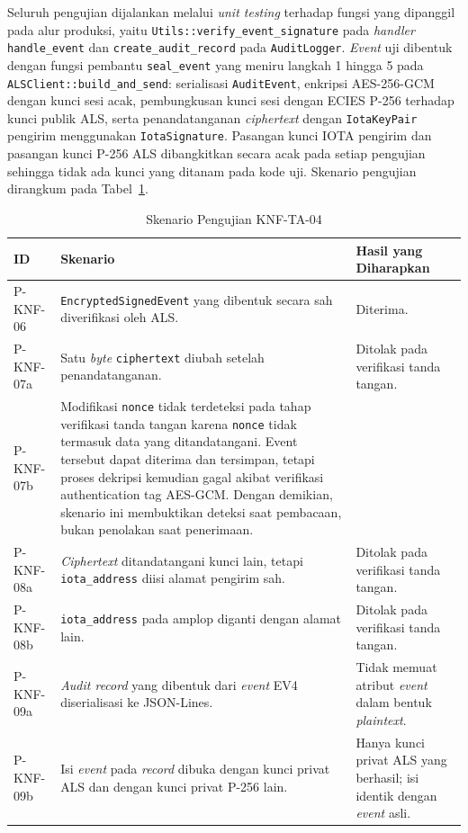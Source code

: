 Seluruh pengujian dijalankan melalui \textit{unit testing} terhadap fungsi yang
dipanggil pada alur produksi, yaitu \texttt{Utils::verify\_event\_signature}
pada \textit{handler} \texttt{handle\_event} dan \texttt{create\_audit\_record}
pada \texttt{AuditLogger}. \textit{Event} uji dibentuk dengan fungsi pembantu
\texttt{seal\_event} yang meniru langkah 1 hingga 5 pada
\texttt{ALSClient::build\_and\_send}: serialisasi \texttt{AuditEvent}, enkripsi
AES-256-GCM dengan kunci sesi acak, pembungkusan kunci sesi dengan ECIES P-256
terhadap kunci publik ALS, serta penandatanganan \textit{ciphertext} dengan
\texttt{IotaKeyPair} pengirim menggunakan \texttt{IotaSignature}. Pasangan kunci
IOTA pengirim dan pasangan kunci P-256 ALS dibangkitkan secara acak pada setiap
pengujian sehingga tidak ada kunci yang ditanam pada kode uji. Skenario
pengujian dirangkum pada Tabel~\ref{tab:skenario-knf-ta-04}.
 
\begin{table}[htbp]
\centering
\caption{Skenario Pengujian KNF-TA-04}
\label{tab:skenario-knf-ta-04}
\renewcommand{\arraystretch}{1.3}
\begin{tabular}{|p{1.7cm}|p{6.3cm}|p{4.5cm}|}
\hline
\textbf{ID} & \textbf{Skenario} & \textbf{Hasil yang Diharapkan} \\
\hline
P-KNF-06 & \texttt{EncryptedSignedEvent} yang dibentuk secara sah diverifikasi oleh ALS. & Diterima. \\
\hline
P-KNF-07a & Satu \textit{byte} \texttt{ciphertext} diubah setelah penandatanganan. & Ditolak pada verifikasi tanda tangan. \\
\hline
P-KNF-07b & Modifikasi \texttt{nonce} tidak terdeteksi pada tahap verifikasi tanda tangan karena \texttt{nonce} tidak termasuk data yang ditandatangani. Event tersebut dapat diterima dan tersimpan, tetapi proses dekripsi kemudian gagal akibat verifikasi authentication tag AES-GCM. Dengan demikian, skenario ini membuktikan deteksi saat pembacaan, bukan penolakan saat penerimaan. \\
\hline
P-KNF-08a & \textit{Ciphertext} ditandatangani kunci lain, tetapi \texttt{iota\_address} diisi alamat pengirim sah. & Ditolak pada verifikasi tanda tangan. \\
\hline
P-KNF-08b & \texttt{iota\_address} pada amplop diganti dengan alamat lain. & Ditolak pada verifikasi tanda tangan. \\
\hline
P-KNF-09a & \textit{Audit record} yang dibentuk dari \textit{event} EV4 diserialisasi ke JSON-Lines. & Tidak memuat atribut \textit{event} dalam bentuk \textit{plaintext}. \\
\hline
P-KNF-09b & Isi \textit{event} pada \textit{record} dibuka dengan kunci privat ALS dan dengan kunci privat P-256 lain. & Hanya kunci privat ALS yang berhasil; isi identik dengan \textit{event} asli. \\
\hline
\end{tabular}
\end{table}
 

